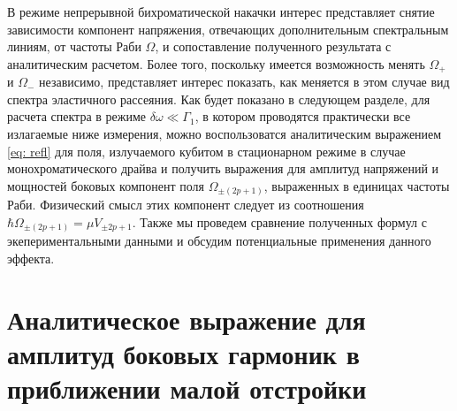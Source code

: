 В режиме непрерывной бихроматической накачки интерес представляет снятие зависимости компонент напряжения, отвечающих дополнительным спектральным линиям, от частоты Раби $\Omega$, и сопоставление  полученного результата с аналитическим расчетом. Более того, поскольку имеется возможность менять $\Omega_+$ и $\Omega_-$ независимо, представляет интерес показать, как меняется в этом случае вид спектра эластичного рассеяния. Как будет показано в следующем разделе, для расчета спектра в режиме $\delta\omega \ll \Gamma_1$, в котором проводятся практически все излагаемые ниже измерения, можно воспользоватся аналитическим выражением \eqref{eq: refl} для поля, излучаемого кубитом в стационарном режиме в случае монохроматического драйва и получить выражения для амплитуд напряжений и мощностей боковых компонент поля $\Omega_{\pm(2p+1)}$, выраженных в единицах частоты Раби. Физический смысл этих компонент следует из соотношения $\hbar\Omega_{\pm(2p+1)} = \mu V_{\pm{2p+1}}$. Также мы проведем сравнение полученных формул с экепериментальными данными и обсудим потенциальные применения данного эффекта.

\section{Аналитическое выражение для амплитуд боковых гармоник в приближении малой отстройки}

